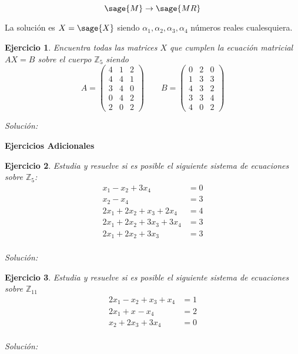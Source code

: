 \documentclass{amsart}
\newtheorem{ejer}{Ejercicio}
\def\z{\mathbb{Z}}
\begin{document}
\[ \sage{M} \to \sage{MR} \]

La solución es $X = \sage{X}$ siendo $\alpha_1, \alpha_2, \alpha_3, \alpha_4$
números reales cualesquiera. 


\begin{ejer}
Encuentra todas las matrices $X$ que cumplen la ecuación matricial $AX = B$
sobre el cuerpo ${\mathbb Z}_5$ siendo 
\[ 
A = \left(\begin{array}{rrr}
4 & 1 & 2 \\
4 & 4 & 1 \\
3 & 4 & 0 \\
0 & 4 & 2 \\
2 & 0 & 2
\end{array}\right)
\qquad 
B = \left(\begin{array}{rrr}
0 & 2 & 0 \\
1 & 3 & 3 \\
4 & 3 & 2 \\
3 & 3 & 4 \\
4 & 0 & 2
\end{array}\right)
\]
\end{ejer}
{\it Solución:}



\newpage 

\begin{center}
{\bf Ejercicios Adicionales}
\end{center}

\begin{ejer} Estudia y resuelve si es posible el siguiente sistema de ecuaciones sobre $\z _5$:
\begin{align*}
x_{1} - x_{2} + 3 x_{4} &= 0 \\
x_{2} - x_{4} &= 3 \\
2 x_{1} + 2 x_{2} + x_{3} + 2 x_{4} &= 4 \\
2 x_{1} + 2 x_{2} + 3 x_{3} + 3 x_{4} &= 3 \\
2 x_{1} + 2 x_{2} + 3 x_{3} &= 3 \\
\end{align*}
\end{ejer}

{\it Soluci\'on:}



\begin{ejer} Estudia y resuelve si es posible el siguiente sistema de ecuaciones 
sobre $\z_{11}$
\begin{align*}
2x_{1} - x_{2} + x_{3} + x_{4} &= 1 \\
2x_{1} + x_{} - x_{4} &= 2 \\
x_{2} + 2x_{3} + 3x_{4} &= 0 \\
\end{align*}
\end{ejer}
{\it Soluci\'on:}
\end{document}
